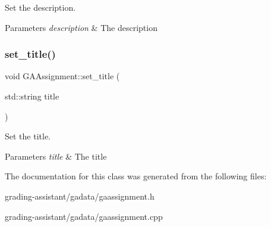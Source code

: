 Set the description. 


\begin{DoxyParams}{Parameters}
{\em description} & The description \\
\hline
\end{DoxyParams}
\mbox{\label{class_g_a_assignment_ac5463bd1ed519444c85a8b4946b22e27}} 
\subsubsection{\texorpdfstring{set\+\_\+title()}{set\_title()}}
{\footnotesize\ttfamily void G\+A\+Assignment\+::set\+\_\+title (\begin{DoxyParamCaption}\item[{std\+::string}]{title }\end{DoxyParamCaption})}



Set the title. 


\begin{DoxyParams}{Parameters}
{\em title} & The title \\
\hline
\end{DoxyParams}


The documentation for this class was generated from the following files\+:\begin{DoxyCompactItemize}
\item 
grading-\/assistant/gadata/gaassignment.\+h\item 
grading-\/assistant/gadata/gaassignment.\+cpp\end{DoxyCompactItemize}
